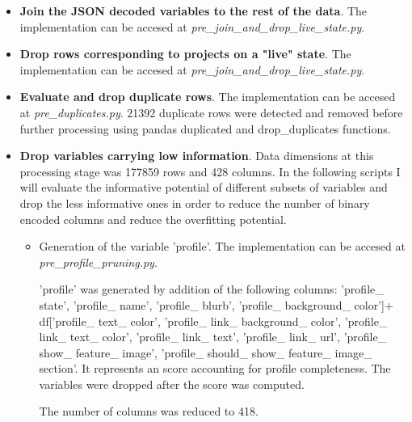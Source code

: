 \documentclass{article}
\begin{document}
{\begin{itemize}
    The variable 'state\_group' was generated by grouping the canceled and suspended projects into 'failed'. It contains then 3 distinct levels ('successful', 'failed' and 'live').
    
    The variable 'state\_code' was generated by dummification from 'state\_grouped' (failed = 0, successful=1, live=2). There are 114940 successful projects, 84311 failed projects and 6651 live projects.

   \item \textbf{Join the JSON decoded variables to the rest of the data}.
   The implementation can be accesed at \emph{pre\_join\_and\_drop\_live\_state.py}.
   
    \item \textbf{Drop rows corresponding to projects on a "live" state}.
    The implementation can be accesed at \emph{pre\_join\_and\_drop\_live\_state.py}.
    
    \item \textbf{Evaluate and drop duplicate rows}.
    The implementation can be accesed at \emph{pre\_duplicates.py}.
    21392 duplicate rows were detected and removed before further processing using pandas duplicated and drop\_duplicates functions.
    
    \item \textbf{Drop variables carrying low information}.
    Data dimensions at this processing stage was 177859 rows and 428 columns. In the following scripts I will evaluate the informative potential of different subsets of variables and drop the less informative ones in order to reduce the number of binary encoded columns and reduce the overfitting potential.
    
    \begin{itemize}
	\item Generation of the variable 'profile'.
        The implementation can be accesed at \emph{pre\_profile\_pruning.py}.
	
	'profile' was generated by addition of the following columns: 'profile\_ state', 'profile\_ name', 'profile\_ blurb', 'profile\_ background\_ color']+ df['profile\_ text\_ color', 'profile\_ link\_ background\_ color', 'profile\_ link\_ text\_ color', 'profile\_ link\_ text', 'profile\_ link\_ url', 'profile\_ show\_ feature\_ image', 'profile\_ should\_ show\_ feature\_ image\_ section'. It represents an score accounting for profile completeness. The variables were dropped after the score was computed.
        
	The number of columns was reduced to 418.
	

\end{itemize}
\end{itemize}}
\end{document}
